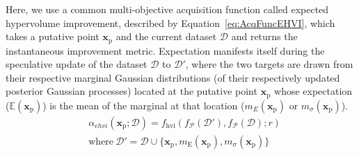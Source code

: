 Here, we use a common multi-objective acquisition function called expected
 hypervolume improvement, described by Equation~\ref{eq:AcqFuncEHVI},
 which takes a putative point \(\mathbf{x}_{\mathrm{p}}\) and the current dataset
 \(\mathcal{D}\) and returns the instantaneous improvement metric.
Expectation manifests itself during the speculative update of the dataset
 \(\mathcal{D}\) to \(\mathcal{D}'\), where the two targets are drawn from
 their respective marginal Gaussian distributions (of their respectively
 updated posterior Gaussian processes) located at the putative point
 \(\mathbf{x}_{\mathrm{p}}\) whose expectation (\(\mathbb{E}(\mathbf{x}_{\mathrm{p}})\)) is
 the mean of the marginal at that location
 (\(m_{E}(\mathbf{x}_{\mathrm{p}})\) or \(m_{\sigma}(\mathbf{x}_{\mathrm{p}})\)).
\small
\begin{equation}\label{eq:AcqFuncEHVI}
    \begin{split}
        &\alpha_{ehvi}(\mathbf{x}_{\mathrm{p}};\mathcal{D})=f_{\mathrm{hvi}}(f_{\mathcal{P}}(\mathcal{D}'),f_{\mathcal{P}}(\mathcal{D});r)\\
        &\mathrm{where}\:\mathcal{D}'=\mathcal{D}\cup\{\mathbf{x}_{\mathrm{p}},m_{\mathrm{E}}(\mathbf{x}_{\mathrm{p}}),m_{\sigma}(\mathbf{x}_{\mathrm{p}})\}
    \end{split}
\end{equation}
\normalsize

